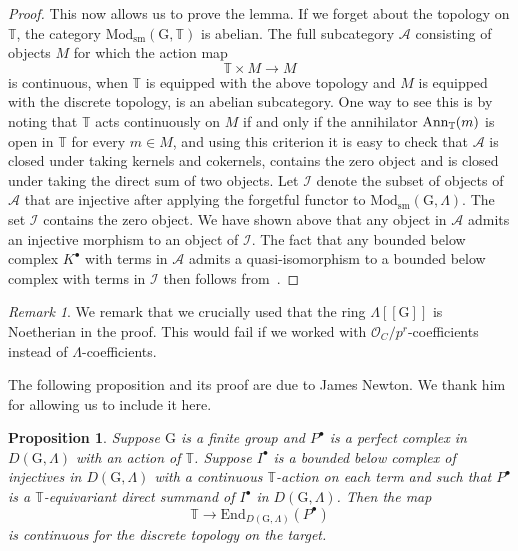 \documentclass{amsart}
\newtheorem{prop}[subsubsection]{Proposition}
\theoremstyle{remark}
\newtheorem{remark}[subsubsection]{Remark}
\numberwithin{equation}{subsection}
\newcommand{\cA}{{\mathcal A}}
\newcommand{\cI}{{\mathcal I}}
\newcommand{\cO}{{\mathcal O}}
\renewcommand{\(}{\left(}
\renewcommand{\)}{\right)}
\begin{document}
\begin{proof}
This now allows us to prove the lemma. If we forget about the topology on $\mathbb{T}$, the category $\mathrm{Mod}_{\mathrm{sm}}(\mathrm{G}, \mathbb{T})$ is abelian. The full subcategory $\cA$ consisting of objects $M$ for which the action map 
\[
\mathbb{T}\times M\to M
\]
is continuous, when $\mathbb{T}$ is equipped with the above topology and $M$ is equipped with the discrete topology, is an abelian subcategory.
One way to see this is by noting that $\mathbb{T}$ acts continuously on $M$ if and only if the annihilator ${\rm Ann}_{\mathbb{T}}(m)$ is open in $\mathbb{T}$ for every $m\in M$, and using this criterion it is easy to check that $\cA$ is closed under taking kernels and cokernels, contains the zero object and is closed under taking the direct sum of two objects. Let $\cI$ denote the subset of objects of $\cA$ that are injective after applying the forgetful functor to $\mathrm{Mod}_{\mathrm{sm}}(\mathrm{G},\Lambda)$. The set $\cI$ contains the zero object. We have shown above that any object in $\cA$ admits an injective morphism to an object of $\cI$. The fact that any bounded below complex $K^\bullet$ with terms in $\cA$ admits a quasi-isomorphism to a bounded below complex with terms in $\cI$ then follows from~\cite[Tag 05T6]{stacks-project}.
\end{proof}

\begin{remark}
We remark that we crucially used that the ring $\Lambda[\![\mathrm{G}]\!]$ is Noetherian in the proof. This would fail if we worked with $\cO_C/p^r$-coefficients instead of $\Lambda$-coefficients.
\end{remark}

The following proposition and its proof are due to James Newton. We thank him for allowing us to include it here.

\begin{prop}\label{getting rid of C} Suppose $\mathrm{G}$ is a finite group and $P^\bullet$ is a perfect complex in $D(\mathrm{G},\Lambda)$ with an action of $\mathbb{T}$. Suppose $I^\bullet$ is a bounded below complex of injectives in $D(\mathrm{G}, \Lambda)$ with a continuous $\mathbb{T}$-action on each term and such that $P^\bullet$ is a $\mathbb{T}$-equivariant
direct summand of $I^\bullet$ in $D(\mathrm{G},\Lambda)$. Then the map
\[
\mathbb{T}\to \mathrm{End}_{D(\mathrm{G},\Lambda)}(P^\bullet)
\]
is continuous for the discrete topology on the target.
\end{prop}
\end{document}
